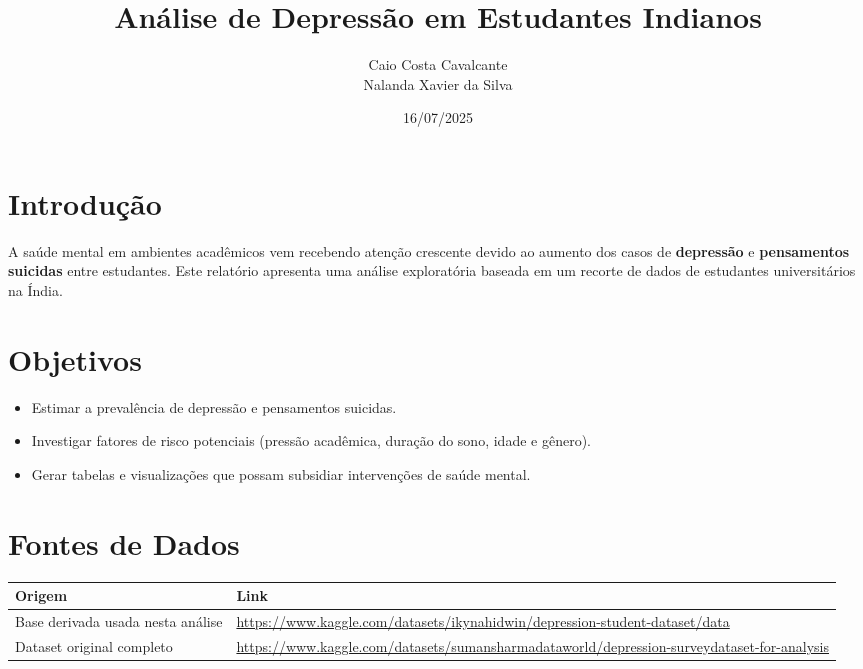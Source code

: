 \documentclass[
]{article}
\title{Análise de Depressão em Estudantes Indianos}
\author{Caio Costa Cavalcante\\
Nalanda Xavier da Silva}
\date{16/07/2025}
\providecommand{\tightlist}{%
  \setlength{\itemsep}{0pt}\setlength{\parskip}{0pt}}
\begin{document}
\maketitle

{
\setcounter{tocdepth}{2}
\tableofcontents
}
\section{Introdução}\label{introducao}

A saúde mental em ambientes acadêmicos vem recebendo atenção crescente
devido ao aumento dos casos de \textbf{depressão} e \textbf{pensamentos
suicidas} entre estudantes. Este relatório apresenta uma análise
exploratória baseada em um recorte de dados de estudantes universitários
na Índia.

\section{Objetivos}\label{objetivos}

\begin{itemize}
\tightlist
\item
  Estimar a prevalência de depressão e pensamentos suicidas.\\
\item
  Investigar fatores de risco potenciais (pressão acadêmica, duração do
  sono, idade e gênero).\\
\item
  Gerar tabelas e visualizações que possam subsidiar intervenções de
  saúde mental.
\end{itemize}

\section{Fontes de Dados}\label{dados}

\begin{longtable}[]{@{}
  >{\raggedright\arraybackslash}p{}
  >{\raggedright\arraybackslash}p{}@{}}
\toprule\noalign{}
\begin{minipage}[b]{\linewidth}\raggedright
Origem
\end{minipage} & \begin{minipage}[b]{\linewidth}\raggedright
Link
\end{minipage} \\
\midrule\noalign{}
\endhead
\bottomrule\noalign{}
\endlastfoot
Base derivada usada nesta análise &
\url{https://www.kaggle.com/datasets/ikynahidwin/depression-student-dataset/data} \\
Dataset original completo &
\url{https://www.kaggle.com/datasets/sumansharmadataworld/depression-surveydataset-for-analysis} \\
\end{longtable}
\end{document}
